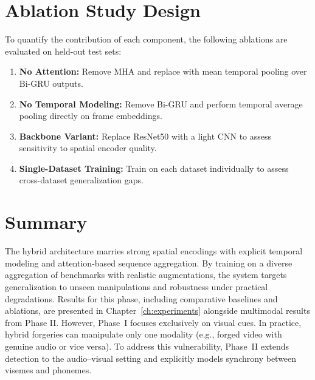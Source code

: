 \section{Ablation Study Design}
To quantify the contribution of each component, the following ablations are evaluated on held-out test sets:
\begin{enumerate}[leftmargin=*]
    \item \textbf{No Attention:} Remove MHA and replace with mean temporal pooling over Bi-GRU outputs.
    \item \textbf{No Temporal Modeling:} Remove Bi-GRU and perform temporal average pooling directly on frame embeddings.
    \item \textbf{Backbone Variant:} Replace ResNet50 with a light CNN to assess sensitivity to spatial encoder quality.
    \item \textbf{Single-Dataset Training:} Train on each dataset individually to assess cross-dataset generalization gaps.
\end{enumerate}

\section{Summary}
The hybrid architecture marries strong spatial encodings with explicit temporal modeling and attention-based sequence aggregation. By training on a diverse aggregation of benchmarks with realistic augmentations, the system targets generalization to unseen manipulations and robustness under practical degradations. Results for this phase, including comparative baselines and ablations, are presented in Chapter~\ref{ch:experiments} alongside multimodal results from Phase II.
However, Phase~I focuses exclusively on visual cues. In practice, hybrid forgeries can manipulate only one modality (e.g., forged video with genuine audio or vice versa). To address this vulnerability, Phase~II extends detection to the audio–visual setting and explicitly models synchrony between visemes and phonemes.

\label{sec:methodology-visual}
